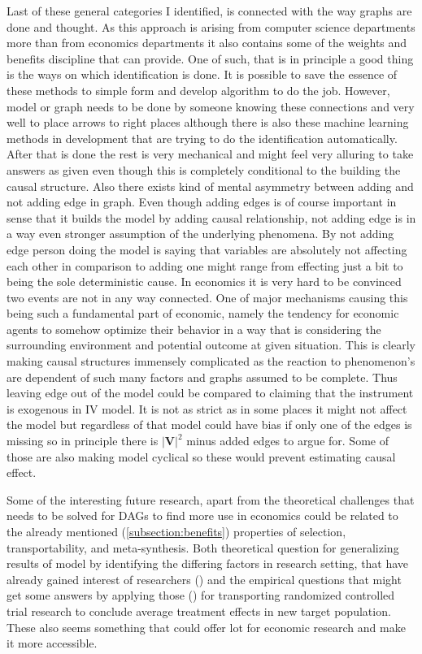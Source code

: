 \documentclass[main=english,12pt,a4paper,pdftex,econ,utf8]{aaltothesis}
\newcommand{\vars}{\bm{V}}
\begin{document}
Last of these general categories I identified, is connected with the way graphs are done and thought. As this approach is arising from computer science departments more than from economics departments it also contains some of the weights and benefits discipline that can provide. One of such, that is in principle a good thing is the ways on which identification is done. It is possible to save the essence of these methods to simple form and develop algorithm to do the job. However, model or graph needs to be done by someone knowing these connections and very well to place arrows to right places although there is also these machine learning methods in development that are trying to do the identification automatically. After that is done the rest is very mechanical and might feel very alluring to take answers as given even though this is completely conditional to the building the causal structure. Also there exists kind of mental asymmetry between adding and not adding edge in graph. Even though adding edges is of course important in sense that it builds the model by adding causal relationship, not adding edge is in a way even stronger assumption of the underlying phenomena. By not adding edge person doing the model is saying that variables are absolutely not affecting each other in comparison to adding one might range from effecting just a bit to being the sole deterministic cause. In economics it is very hard to be convinced two events are not in any way connected. One of major mechanisms causing this being such a fundamental part of economic, namely the tendency for economic agents to somehow optimize their behavior in a way that is considering the surrounding environment and potential outcome at given situation. This is clearly making causal structures immensely complicated as the reaction to phenomenon's are dependent of such many factors and graphs assumed to be complete. Thus leaving edge out of the model could be compared to claiming that the instrument is exogenous in IV model. It is not as strict as in some places it might not affect the model but regardless of that model could have bias if only one of the edges is missing so in principle there is $|\vars|^2$ minus added edges to argue for. Some of those are also making model cyclical so these would prevent estimating causal effect.

Some of the interesting future research, apart from the theoretical challenges that needs to be solved for DAGs to find more use in economics could be related to the already mentioned (\ref{subsection:benefits}) properties of selection, transportability, and meta-synthesis. Both theoretical question for generalizing results of model by identifying the differing factors in research setting, that have already gained interest of researchers (\cite{Cinelli2021}) and the empirical questions that might get some answers by applying those (\cite{Dahabreh2020}) for transporting randomized controlled trial research to conclude average treatment effects in new target population. These also seems something that could offer lot for economic research and make it more accessible.
\end{document}
